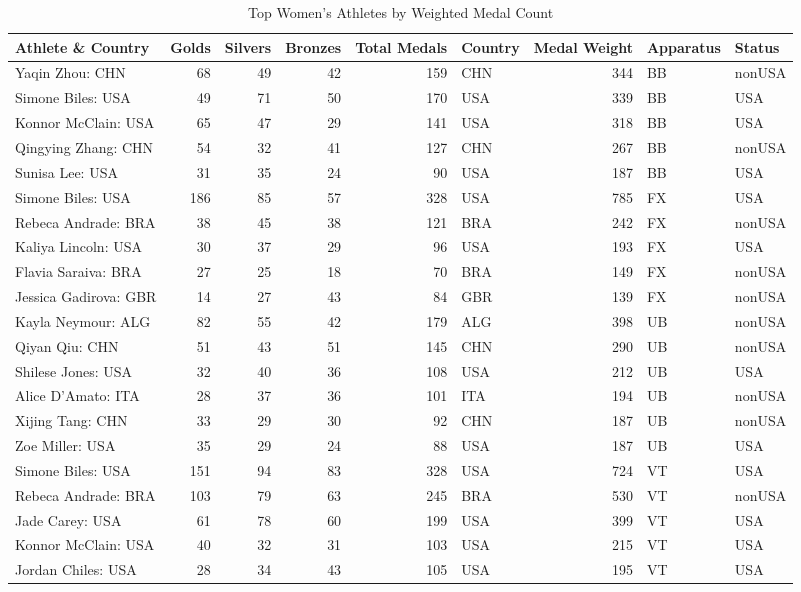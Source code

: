 \documentclass[
  10.5pt,
  letterpaper,
  DIV=11,
  numbers=noendperiod]{scrartcl}
\begin{document}
\begin{table}[H]

\caption{Top Women's Athletes by Weighted Medal Count}
\centering
\fontsize{8}{10}\selectfont
\begin{tabular}[t]{l|r|r|r|r|l|r|l|l}
\hline
Athlete \& Country & Golds & Silvers & Bronzes & Total Medals & Country & Medal Weight & Apparatus & Status\\
\hline
Yaqin Zhou: CHN & 68 & 49 & 42 & 159 & CHN & 344 & BB & nonUSA\\
\hline
Simone Biles: USA & 49 & 71 & 50 & 170 & USA & 339 & BB & USA\\
\hline
Konnor McClain: USA & 65 & 47 & 29 & 141 & USA & 318 & BB & USA\\
\hline
Qingying Zhang: CHN & 54 & 32 & 41 & 127 & CHN & 267 & BB & nonUSA\\
\hline
Sunisa Lee: USA & 31 & 35 & 24 & 90 & USA & 187 & BB & USA\\
\hline
Simone Biles: USA & 186 & 85 & 57 & 328 & USA & 785 & FX & USA\\
\hline
Rebeca Andrade: BRA & 38 & 45 & 38 & 121 & BRA & 242 & FX & nonUSA\\
\hline
Kaliya Lincoln: USA & 30 & 37 & 29 & 96 & USA & 193 & FX & USA\\
\hline
Flavia Saraiva: BRA & 27 & 25 & 18 & 70 & BRA & 149 & FX & nonUSA\\
\hline
Jessica Gadirova: GBR & 14 & 27 & 43 & 84 & GBR & 139 & FX & nonUSA\\
\hline
Kayla Neymour: ALG & 82 & 55 & 42 & 179 & ALG & 398 & UB & nonUSA\\
\hline
Qiyan Qiu: CHN & 51 & 43 & 51 & 145 & CHN & 290 & UB & nonUSA\\
\hline
Shilese Jones: USA & 32 & 40 & 36 & 108 & USA & 212 & UB & USA\\
\hline
Alice D'Amato: ITA & 28 & 37 & 36 & 101 & ITA & 194 & UB & nonUSA\\
\hline
Xijing Tang: CHN & 33 & 29 & 30 & 92 & CHN & 187 & UB & nonUSA\\
\hline
Zoe Miller: USA & 35 & 29 & 24 & 88 & USA & 187 & UB & USA\\
\hline
Simone Biles: USA & 151 & 94 & 83 & 328 & USA & 724 & VT & USA\\
\hline
Rebeca Andrade: BRA & 103 & 79 & 63 & 245 & BRA & 530 & VT & nonUSA\\
\hline
Jade Carey: USA & 61 & 78 & 60 & 199 & USA & 399 & VT & USA\\
\hline
Konnor McClain: USA & 40 & 32 & 31 & 103 & USA & 215 & VT & USA\\
\hline
Jordan Chiles: USA & 28 & 34 & 43 & 105 & USA & 195 & VT & USA\\
\hline
\end{tabular}
\end{table}
\end{document}
